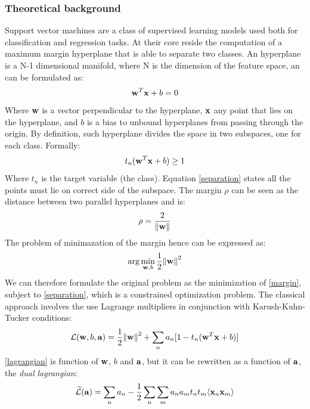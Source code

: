 \documentclass[nocrop]{bioinfo}
\begin{document}
\begin{methods}
\subsubsection*{Theoretical background}
Support vector machines \citep{Cortes1995} are a class of supervised learning models used both for classification and regression tasks.
At their core reside the computation of a maximum margin hyperplane that is able to separate two classes.
An hyperplane is a N-1 dimensional manifold, where N is the dimension of the feature space, an can be formulated as: 
\begin{equation}
	\vb{w}^T\vb{x}+b=0
\end{equation}
Where $\vb{w}$ is a vector perpendicular to the hyperplane, $\vb{x}$ any point that lies on the hyperplane, and $b$ is a bias to unbound hyperplanes from passing through the origin.
By definition, such hyperplane divides the space in two subspaces, one for each class.
Formally:
\begin{equation}\label{separation}
	t_n(\vb{w}^T\vb{x}+b) \geq 1
\end{equation}
Where $t_n$ is the target variable (the class).
Equation \eqref{separation} states all the points must lie on correct side of the subspace.
The margin $\rho$ can be seen as the distance between two parallel hyperplanes and is:
\begin{equation}\label{margin}
	\rho = \frac{2}{\norm{\vb{w}}}
\end{equation}
The problem of minimazation of the margin hence can be expressed as:
\begin{equation}
	\arg\min_{\vb{w}, b}  \frac{1}{2} \norm{\vb{w}}^2
\end{equation}
We can therefore formulate the original problem as the minimization of \eqref{margin}, subject to \eqref{separation}, which is a constrained optimization problem.
The classical approach involves the use Lagrange multipliers in conjunction with Karush-Kuhn-Tucker \citep{Karush} conditions:
\begin{equation}\label{lagrangian}
	\mathcal{L}(\vb{w},b,\vb{a}) = \frac{1}{2}\norm{\vb{w}}^2 + \sum_n a_n [1 - t_n(\vb{w}^T\vb{x} + b)]
\end{equation}
\eqref{lagrangian} is function of $\vb{w}$, $b$ and $\vb{a}$, but it can be rewritten as a function of $\vb{a}$, the \textit{dual lagrangian}:
\begin{equation}\label{dual}
	\mathcal{\widetilde{L}}(\vb{a}) = \sum_n a_n - \frac{1}{2}\sum_n \sum_m a_n a_m t_n t_m \langle\vb{x}_n \vb{x}_m\rangle 

\end{equation}
\end{methods}
\end{document}
